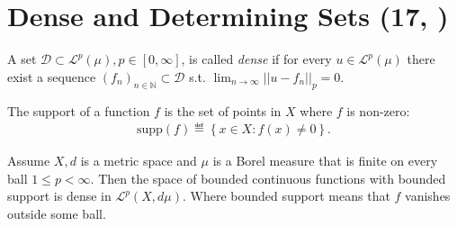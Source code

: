 \section{Dense and Determining Sets \tiny{(17, \cite{schilling2017measures})}}
\begin{definition}
    A set \(\mathcal{D}\subset\mathcal{L}^p(\mu), p\in[0,\infty]\), is called \emph{dense} if for every \(u\in\mathcal{L}^p(\mu)\) there exist
    a sequence \((f_n)_{n\in\mathbb{N}}\subset\mathcal{D}\) s.t. \(\lim_{n\rightarrow\infty}\vert\vert u-f_n\vert\vert_p=0\).
\end{definition}
\begin{definition}[Support]
    The support of a function \(f\) is the set of points in \(X\) where \(f\) is non-zero:
    \begin{align*}
        \text{supp}(f) \eqdef \left\{x\in X:f(x)\neq0\right\}.
    \end{align*}
\end{definition}
\begin{theorem}
    Assume \(X,d\) is a metric space and \(\mu\) is a Borel measure that is finite on every ball \(1\leq p<\infty\). Then the space of 
    bounded continuous functions with bounded support is dense in \(\mathcal{L}^p(X,d\mu)\). Where bounded support means that \(f\) vanishes outside
    some ball.
\end{theorem}
\ifdetailed
